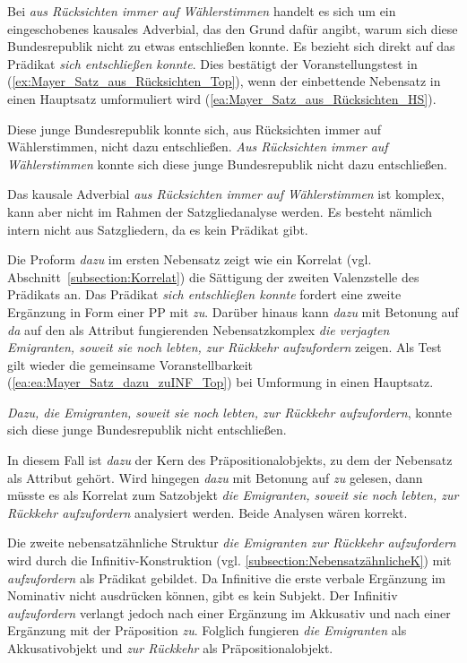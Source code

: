 Bei \textit{aus Rücksichten immer auf Wählerstimmen} handelt es sich um ein eingeschobenes kausales Adverbial, das den Grund dafür angibt, warum sich diese Bundesrepublik nicht zu etwas entschließen konnte. Es bezieht sich direkt auf das Prädikat \textit{sich entschließen konnte}. Dies bestätigt der Voranstellungstest in (\ref{ex:Mayer_Satz_aus_Rücksichten_Top}), wenn der einbettende Nebensatz in einen Hauptsatz umformuliert wird (\ref{ea:Mayer_Satz_aus_Rücksichten_HS}). 

\ea \label{ea:Mayer_Satz_aus_Rücksichten_Top_HS} 
\ea \label{ea:Mayer_Satz_aus_Rücksichten_HS} Diese junge Bundesrepublik konnte sich, aus Rücksichten immer auf Wählerstimmen, nicht dazu entschließen.
\ex \label{ex:Mayer_Satz_aus_Rücksichten_Top} \textit{Aus Rücksichten immer auf Wählerstimmen} konnte sich diese junge Bundesrepublik nicht dazu entschließen.
\z 
\z 

Das kausale Adverbial \textit{aus Rücksichten immer auf Wählerstimmen} ist komplex, kann aber nicht im Rahmen der Satzgliedanalyse  werden. Es besteht nämlich intern nicht aus Satzgliedern, da es kein Prädikat gibt.

Die Proform \textit{dazu} im ersten Nebensatz zeigt wie ein Korrelat (vgl. Abschnitt~\ref{subsection:Korrelat}) die Sättigung der zweiten Valenzstelle des Prädikats an. Das Prädikat \textit{sich entschließen konnte} fordert eine zweite Ergänzung in Form einer PP mit \textit{zu}. Darüber hinaus kann \textit{dazu} mit Betonung auf \textit{da} auf den als Attribut fungierenden Nebensatzkomplex \textit{die verjagten Emigranten, soweit sie noch lebten, zur Rückkehr aufzufordern} zeigen. Als Test gilt wieder die gemeinsame Voranstellbarkeit (\ref{ea:ea:Mayer_Satz_dazu_zuINF_Top}) bei Umformung in einen Hauptsatz.

\ea \label{ea:ea:Mayer_Satz_dazu_zuINF_Top} \textit{Dazu, die Emigranten, soweit sie noch lebten, zur Rückkehr aufzufordern}, konnte sich diese junge Bundesrepublik nicht entschließen.
\z 

In diesem Fall ist \textit{dazu} der Kern des Präpositionalobjekts, zu dem der Nebensatz als Attribut gehört. Wird hingegen \textit{dazu} mit Betonung auf \textit{zu} gelesen, dann müsste es als Korrelat zum Satzobjekt \textit{die Emigranten, soweit sie noch lebten, zur Rückkehr aufzufordern} analysiert werden. Beide Analysen wären korrekt.  

Die zweite nebensatzähnliche Struktur \textit{die Emigranten zur Rückkehr aufzufordern} wird durch die Infinitiv-Konstruktion (vgl. \ref{subsection:NebensatzähnlicheK}) mit \textit{aufzufordern} als Prädikat gebildet. Da Infinitive die erste verbale Ergänzung im Nominativ nicht ausdrücken können, gibt es kein Subjekt. Der Infinitiv \textit{aufzufordern} verlangt jedoch nach einer Ergänzung im Akkusativ und nach einer Ergänzung mit der Präposition \textit{zu}. Folglich fungieren \textit{die Emigranten} als Akkusativobjekt und \textit{zur Rückkehr} als Präpositionalobjekt.

